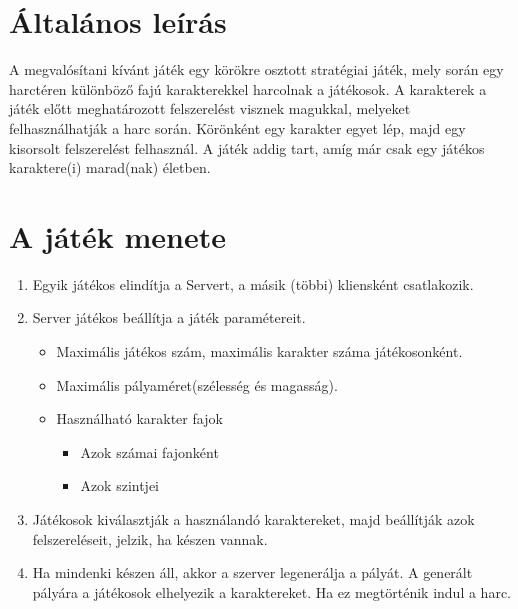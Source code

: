 \section{Általános leírás}
A megvalósítani kívánt játék egy körökre osztott stratégiai játék, mely során egy harctéren különböző fajú karakterekkel harcolnak a játékosok.
A karakterek a játék előtt meghatározott felszerelést visznek magukkal, melyeket felhasználhatják a harc során. Körönként egy karakter egyet lép, majd egy kisorsolt felszerelést felhasznál. A játék addig tart, amíg már csak egy játékos karaktere(i) marad(nak) életben.


\section{A játék menete}
\begin{enumerate}
	\item Egyik játékos elindítja a Servert, a másik (többi) kliensként csatlakozik.
	\item Server játékos beállítja a játék paramétereit.
	\begin{itemize}\label{StartParams}
		\item Maximális játékos szám, maximális karakter száma játékosonként.
		\item Maximális pályaméret(szélesség és magasság).
		\item Használható karakter fajok
		\begin{itemize}
			\item Azok számai fajonként
			\item Azok szintjei
		\end{itemize}
	\end{itemize}
	\item Játékosok kiválasztják a használandó karaktereket, majd beállítják azok felszereléseit, jelzik, ha készen vannak.
	\item Ha mindenki készen áll, akkor a szerver legenerálja a pályát. A generált pályára a játékosok elhelyezik a karaktereket. Ha ez megtörténik indul a harc.
\end{enumerate}


